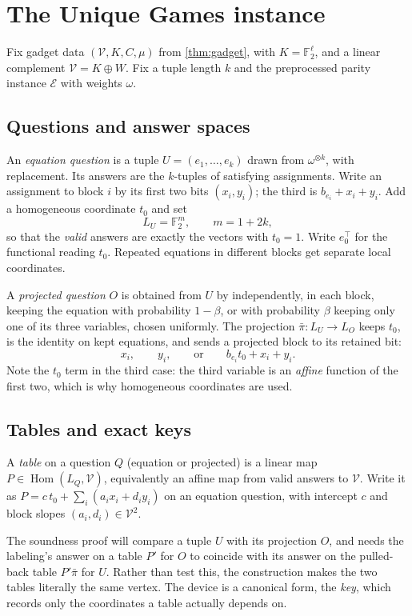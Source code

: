 \documentclass[11pt]{article}
\theoremstyle{definition}
\theoremstyle{remark}
\newcommand{\F}{\mathbb F}
\newcommand{\V}{\mathcal V}
\newcommand{\cE}{\mathcal E}
\newcommand{\bpi}{\bar\pi}
\DeclareMathOperator{\Hom}{Hom}
\begin{document}
\section{The Unique Games instance}\label{sec:instance}

Fix gadget data $(\V,K,C,\mu)$ from \cref{thm:gadget}, with $K=\F_2^\ell$, and a
linear complement $\V=K\oplus W$. Fix a tuple length $k$ and the preprocessed
parity instance $\cE$ with weights $\omega$.

\subsection{Questions and answer spaces}

An \emph{equation question} is a tuple $U=(e_1,\dots,e_k)$ drawn from
$\omega^{\otimes k}$, with replacement. Its answers are the $k$-tuples of
satisfying assignments. Write an assignment to block $i$ by its first two bits
$(x_i,y_i)$; the third is $b_{e_i}+x_i+y_i$. Add a homogeneous coordinate
$t_0$ and set
\[
L_U=\F_2^{m},\qquad m=1+2k,
\]
so that the \emph{valid} answers are exactly the vectors with $t_0=1$. Write
$e_0^\top$ for the functional reading $t_0$. Repeated equations in different
blocks get separate local coordinates.

A \emph{projected question} $O$ is obtained from $U$ by independently, in each
block, keeping the equation with probability $1-\beta$, or with probability
$\beta$ keeping only one of its three variables, chosen uniformly. The
projection $\bpi\colon L_U\to L_O$ keeps $t_0$, is the identity on kept
equations, and sends a projected block to its retained bit:
\[
x_i,\qquad y_i,\qquad\text{or}\qquad b_{e_i}t_0+x_i+y_i .
\]
Note the $t_0$ term in the third case: the third variable is an \emph{affine}
function of the first two, which is why homogeneous coordinates are used.

\subsection{Tables and exact keys}\label{sec:keys}

A \emph{table} on a question $Q$ (equation or projected) is a linear map
$P\in\Hom(L_Q,\V)$, equivalently an affine map from valid answers to $\V$.
Write it as $P=c\,t_0+\sum_i(a_ix_i+d_iy_i)$ on an equation question, with
intercept $c$ and block slopes $(a_i,d_i)\in\V^2$.

The soundness proof will compare a tuple $U$ with its projection $O$, and
needs the labeling's answer on a table $P'$ for $O$ to coincide with its
answer on the pulled-back table $P'\bpi$ for $U$. Rather than test this, the
construction makes the two tables literally the same vertex. The device is a
canonical form, the \emph{key}, which records only the coordinates a table
actually depends on.
\end{document}
